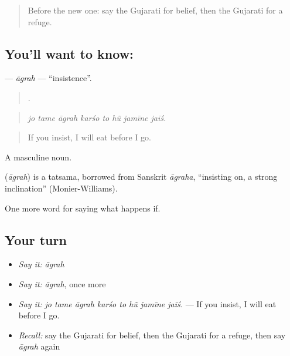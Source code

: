 \label{lesson:GU-C386-agrah}



\begin{quote}
Before the new one: say the Gujarati for belief, then the Gujarati for a refuge.
\end{quote}

\subsection*{You'll want to know: }
\textbf{} — \emph{āgrah} — \textquotedblleft{}insistence\textquotedblright{}.

\begin{quote}
       .
\end{quote}

\begin{quote}
\emph{jo tame āgrah karśo to hũ jamīne jaīś.}
\end{quote}

\begin{quote}
If you insist, I will eat before I go.
\end{quote}

A masculine noun.

\begin{cousinweb}
\textbf{} (\emph{āgrah}) is a tatsama, borrowed from Sanskrit \emph{āgraha}, \textquotedblleft{}insisting on, a strong inclination\textquotedblright{} (Monier-Williams).
\end{cousinweb}

\begin{grammarlens}[title={What you've built}]
One more word for saying what happens if.
\end{grammarlens}

\subsection*{Your turn}
\begin{itemize}
\raggedright
  \item \emph{Say it:} \emph{āgrah}
  \item \emph{Say it:} \emph{āgrah}, once more
  \item \emph{Say it:} \emph{jo tame āgrah karśo to hũ jamīne jaīś.} — If you insist, I will eat before I go.
  \item \emph{Recall:} say the Gujarati for belief, then the Gujarati for a refuge, then say \emph{āgrah} again
\end{itemize}

